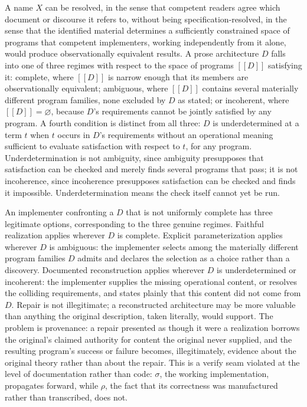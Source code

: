 A name $X$ can be resolved, in the sense that competent readers agree which document or discourse it refers to, without being specification-resolved, in the sense that the identified material determines a sufficiently constrained space of programs that competent implementers, working independently from it alone, would produce observationally equivalent results. A prose architecture $D$ falls into one of three regimes with respect to the space of programs $[[D]]$ satisfying it: complete, where $[[D]]$ is narrow enough that its members are observationally equivalent; ambiguous, where $[[D]]$ contains several materially different program families, none excluded by $D$ as stated; or incoherent, where $[[D]] = \varnothing$, because $D$'s requirements cannot be jointly satisfied by any program. A fourth condition is distinct from all three: $D$ is underdetermined at a term $t$ when $t$ occurs in $D$'s requirements without an operational meaning sufficient to evaluate satisfaction with respect to $t$, for any program. Underdetermination is not ambiguity, since ambiguity presupposes that satisfaction can be checked and merely finds several programs that pass; it is not incoherence, since incoherence presupposes satisfaction can be checked and finds it impossible. Underdetermination means the check itself cannot yet be run.

An implementer confronting a $D$ that is not uniformly complete has three legitimate options, corresponding to the three genuine regimes. Faithful realization applies wherever $D$ is complete. Explicit parameterization applies wherever $D$ is ambiguous: the implementer selects among the materially different program families $D$ admits and declares the selection as a choice rather than a discovery. Documented reconstruction applies wherever $D$ is underdetermined or incoherent: the implementer supplies the missing operational content, or resolves the colliding requirements, and states plainly that this content did not come from $D$. Repair is not illegitimate; a reconstructed architecture may be more valuable than anything the original description, taken literally, would support. The problem is provenance: a repair presented as though it were a realization borrows the original's claimed authority for content the original never supplied, and the resulting program's success or failure becomes, illegitimately, evidence about the original theory rather than about the repair. This is a verify seam violated at the level of documentation rather than code: $\sigma$, the working implementation, propagates forward, while $\rho$, the fact that its correctness was manufactured rather than transcribed, does not.

